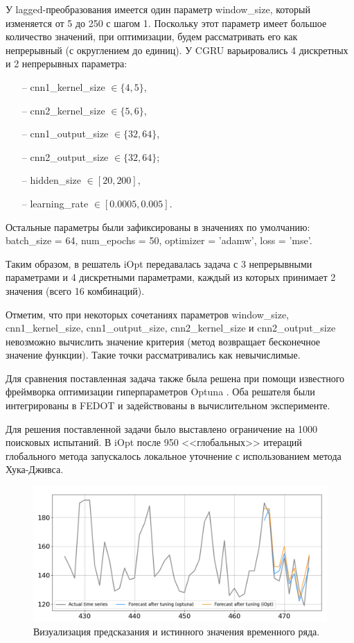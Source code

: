 \documentclass[a4paper,12pt,russian]{article}
\begin{document}

У lagged-преобразования имеется один параметр window\_size, который изменяется от 5 до 250 с шагом 1. Поскольку этот параметр имеет большое количество значений, при оптимизации, будем рассматривать его как непрерывный (с округлением до единиц). У CGRU варьировались 4 дискретных и 2 непрерывных параметра:
\begin{itemize}
\item[--] cnn1\_kernel\_size $\in \{4, 5\}$,
\item[--] cnn2\_kernel\_size $\in \{5, 6\}$, 
\item[--] cnn1\_output\_size $\in \{32, 64\}$, 
\item[--] cnn2\_output\_size $\in \{32, 64\}$;
\item[--] hidden\_size $\in [20, 200]$, 
\item[--] learning\_rate $\in [0.0005, 0.005]$.
\end{itemize}
Остальные параметры были зафиксированы в значениях по умолчанию: batch\_size = 64, num\_epochs = 50, optimizer = 'adamw', loss = 'mse'.

Таким образом, в решатель iOpt передавалась задача с 3 непрерывными параметрами и 4 дискретными параметрами, каждый из которых принимает 2 значения (всего 16 комбинаций).

Отметим, что при некоторых сочетаниях параметров window\_size, cnn1\_kernel\_size, cnn1\_output\_size, cnn2\_kernel\_size и cnn2\_output\_size невозможно вычислить значение критерия (метод возвращает бесконечное значение функции). Такие точки рассматривались как невычислимые.

Для сравнения поставленная задача также была решена при помощи известного фреймворка оптимизации гиперпараметров Optuna%
. Оба решателя были интегрированы в FEDOT и задействованы в вычислительном эксперименте.

Для решения поставленной задачи было выставлено ограничение на 1000 поисковых испытаний. В iOpt после 950 <<глобальных>> итераций глобального метода запускалось локальное уточнение с использованием метода Хука-Дживса. %

\begin{figure}[h!]
\center \includegraphics[scale=0.94]{fig3.png}
\caption{Визуализация предсказания и истинного значения временного ряда. } \label{fig3}
\end{figure}
\end{document}
